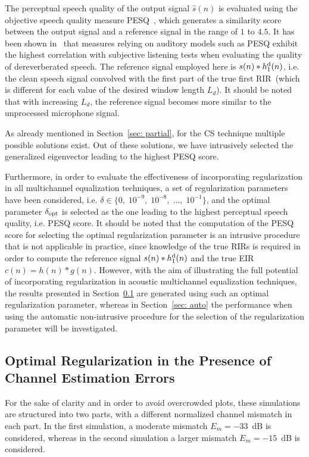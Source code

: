 \documentclass[10pt]{IEEEtran}
\begin{document}
The perceptual speech quality of the output signal $\hat{s}(n)$ is evaluated using the objective speech quality measure PESQ~\cite{PESQ}, which generates a similarity score between the output signal and a reference signal in the range of $1$ to $4.5$.
It has been shown in~\cite{Goetze_AES_2010} that measures relying on auditory models such as PESQ exhibit the highest correlation with subjective listening tests when evaluating the quality of dereverberated speech.
The reference signal employed here is $s(n) \ast h_1^{\rm d}(n)$, i.e. the clean speech signal convolved with the first part of the true first RIR~(which is different for each value of the desired window length $L_d$).
It should be noted that with increasing $L_d$, the reference signal becomes more similar to the unprocessed microphone signal.

As already mentioned in Section~\ref{sec: partial}, for the CS technique multiple possible solutions exist.
Out of these solutions, we have intrusively selected the generalized eigenvector leading to the highest PESQ score.


Furthermore, in order to evaluate the effectiveness of incorporating regularization in all multichannel equalization techniques, a set of regularization parameters have been considered, i.e. $\delta \in \{0, \; 10^{-9}, \; 10^{-8}, \; \ldots, \; 10^{-1} \}$, and the optimal parameter $\delta_{\rm opt}$ is selected as the one leading to the highest perceptual speech quality, i.e. PESQ score.
It should be noted that the computation of the PESQ score for selecting the optimal regularization parameter is an intrusive procedure that is not applicable in practice, since knowledge of the true RIRs is required in order to compute the reference signal $s(n) \ast h_1^{\rm d}(n)$ and the true EIR $c(n) = h(n) \ast g(n)$.
However, with the aim of illustrating the full potential of incorporating regularization in acoustic multichannel equalization techniques, the results presented in Section~\ref{sec: regacsys} are generated using such an optimal regularization parameter, whereas in Section~\ref{sec: auto} the performance when using the automatic non-intrusive procedure for the selection of the regularization parameter will be investigated.

\subsection{Optimal Regularization in the Presence of Channel Estimation Errors}
\label{sec: regacsys}
For the sake of clarity and in order to avoid overcrowded plots, these simulations are structured into two parts, with a different normalized channel mismatch in each part.
In the first simulation, a moderate mismatch $E_m = -33$~dB is considered, whereas in the second simulation a larger mismatch $E_m = -15$~dB is considered.
\end{document}
